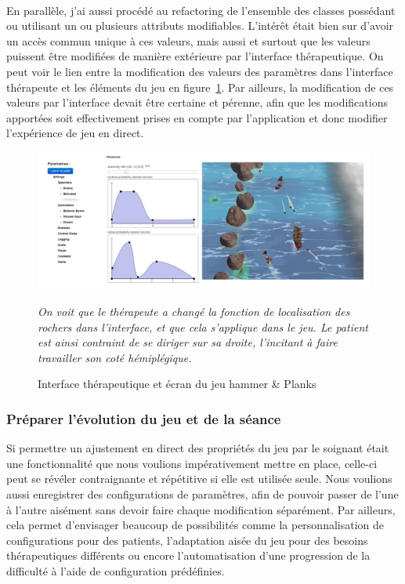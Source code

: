 \paragraph{}
En parallèle, j'ai aussi procédé au refactoring de l'ensemble des classes possédant ou utilisant un ou plusieurs attributs modifiables. L'intérêt était bien sur d'avoir un accès commun unique à ces valeurs, mais aussi et surtout que les valeurs puissent être modifiées de manière extérieure par l'interface thérapeutique. On peut voir le lien entre la modification des valeurs des paramètres dans l'interface thérapeute et les éléments du jeu en figure~\ref{comparatif_interface_rochers}. Par ailleurs, la modification de ces valeurs par l'interface devait être certaine et pérenne, afin que les modifications apportées soit effectivement prises en compte par l'application et donc modifier l'expérience de jeu en direct.

\begin{figure}[!hbtp]
	\centering
	\includegraphics[width=16cm]{images/comparatif_interface_rochers.png}
	\caption{Interface thérapeutique et écran du jeu hammer \& Planks}
\emph{	On voit que le thérapeute a changé la fonction de localisation des rochers dans l'interface, et que cela s'applique dans le jeu. Le patient est ainsi contraint de se diriger sur sa droite, l'incitant à faire travailler son coté hémiplégique.}
	\label{comparatif_interface_rochers}
\end{figure}

	\subsubsection*{Préparer l'évolution du jeu et de la séance}
Si permettre un ajustement en direct des propriétés du jeu par le soignant était une fonctionnalité que nous voulions impérativement mettre en place, celle-ci peut se révéler contraignante et répétitive si elle est utilisée seule. Nous voulions aussi enregistrer des configurations de paramètres, afin de pouvoir passer de l'une à l'autre aisément sans devoir faire chaque modification séparément. Par ailleurs, cela permet d'envisager beaucoup de possibilités comme la personnalisation de configurations pour des patients, l'adaptation aisée du jeu pour des besoins thérapeutiques différents ou encore l'automatisation d'une progression de la difficulté à l'aide de configuration prédéfinies.

